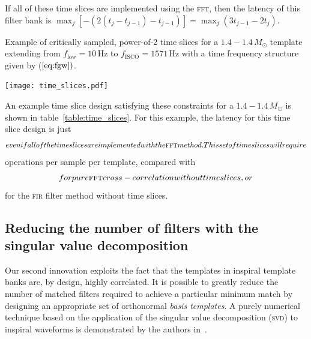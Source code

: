 If all of these time slices are implemented using the \textsc{fft}, then the latency of this filter bank is $\max_j {\left[-\left( 2(t_j - t_{j-1}) - t_{j-1} \right)\right]} = \max_j \left( 3 t_{j-1} - 2 t_j \right)$.

\begin{table}[h!]
\caption{Example of critically sampled, power-of-2 time slices for a $1.4 - 1.4 \, M_{\odot}$ template extending from $f_\mathrm{low} = 10 \, \mathrm{Hz}$ to $f_\mathrm{ISCO} = 1571\, \mathrm{Hz}$ with a time frequency structure given by ($\ref{eq:fgw})$.}
\label{table:time_slices}
\begin{minipage}[c]{0.5\textwidth}
\centering
\texttt{[image: time\_slices.pdf]}
\end{minipage}
\begin{minipage}[c]{0.3\textwidth}
\centering

\end{minipage}
\end{table}

An example time slice design satisfying these constraints for a $1.4 - 1.4 \, M_{\odot}$ is shown in table~\ref{table:time_slices}.  For this example, the latency for this time slice design is just $$ even if all of the time slices are implemented with the \textsc{fft} method.  This set of time slices will require $$ operations per sample per template, compared with $$ for pure \textsc{fft} cross-correlation without time slices, or $$ for the \textsc{fir} filter method without time slices.

\subsection{Reducing the number of filters with the singular value decomposition}

Our second innovation exploits the fact that the templates in inspiral template banks are, by design, highly correlated.  It is possible to greatly reduce the number of matched filters required to achieve a particular minimum match by designing an appropriate set of orthonormal {\em basis templates}.  A purely numerical technique based on the application of the singular value decomposition (\textsc{svd}) to inspiral waveforms is demonstrated by the authors in~\cite{Cannon:2010p10398}.

